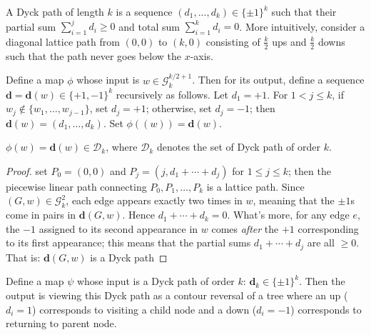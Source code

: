\begin{definition}
  \notready
  \label{def:Dyck_paths}
  A Dyck path of length $k$ is a sequence $(d_1,...,d_k) \in \{\pm 1\}^k$ such that their partial sum $\sum_{i=1}^j d_i \geq 0$
  and total sum $\sum_{i = 1}^{k}d_i = 0$. More intuitively, consider a diagonal lattice path from $(0,0)$ to $(k, 0)$ consisting of
  $\frac{k}{2}$ ups and $\frac{k}{2}$ downs such that the path never goes below the $x$-axis.
\end{definition}


\begin{definition}
  \notready
  \label{def:graph_to_Dyck_map}
   Define a map $\phi$ whose input is $w \in \mathcal{G}^{k/2 + 1}_k$. Then for its output,
   define a sequence $\mathbf{d}=\mathbf{d}(w)\in\{+1,-1\}^k$ recursively as follows.
   Let $d_1=+1$.  For $1<j\le k$, if $w_j\notin\{w_1,\ldots,w_{j-1}\}$, set $d_j=+1$; otherwise, set $d_j=-1$; then
   $\mathbf{d}(w) = (d_1,\ldots,d_k)$. Set $\phi((w)) = \mathbf{d}(w)$.
\end{definition}


\begin{lemma}
  \notready
  \label{lem:graph_Dyck_correspondence}
  $\phi(w) = \mathbf{d}(w) \in \mathcal{D}_k$, where $\mathcal{D}_k$ denotes the set of Dyck path of order $k$.
\end{lemma}

\begin{proof}
  \notready
  set $P_0 = (0,0)$ and $P_j = (j,d_1+\cdots+d_j)$ for $1\le j\le k$; then the piecewise linear path
  connecting $P_0,P_1,\ldots,P_k$ is a lattice path.  Since $(G,w)\in\mathcal{G}_k^2$, each edge appears exactly two times in $w$,
  meaning that the $\pm1$s come in pairs in $\mathbf{d}(G,w)$.  Hence $d_1+\cdots+d_k=0$.  What's more, for any edge $e$,
  the $-1$ assigned to its second appearance in $w$ comes {\em after} the $+1$ corresponding to its first appearance;
  this means that the partial sums $d_1+\cdots+d_j$ are all $\ge 0$.  That is: $\mathbf{d}(G,w)$ is a Dyck path
\end{proof}


\begin{definition}
  \notready
  \label{def:Dyck_to_graph_map}
  Define a map $\psi$ whose input is a Dyck path of order $k$: $\mathbf{d}_k \in \{\pm1\}^k$. Then the output is viewing
  this Dyck path as a contour reversal of a tree where an up ($d_i = 1$) corresponds to visiting a child node
  and a down ($d_i = -1$) corresponds to returning to parent node.
\end{definition}


